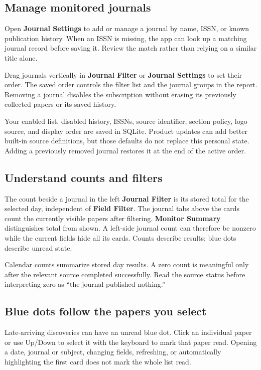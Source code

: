 \documentclass[10pt,letterpaper,oneside]{scrreprt}
\begin{document}
\subsection{Manage monitored journals}\label{manage-monitored-journals}

Open \textbf{Journal Settings} to add or manage a journal by name, ISSN, or known publication history. When an ISSN is missing, the app can look up a matching journal record before saving it. Review the match rather than relying on a similar title alone.

Drag journals vertically in \textbf{Journal Filter} or \textbf{Journal Settings} to set their order. The saved order controls the filter list and the journal groups in the report. Removing a journal disables the subscription without erasing its previously collected papers or its saved history.

Your enabled list, disabled history, ISSNs, source identifier, section policy, logo source, and display order are saved in SQLite. Product updates can add better built-in source definitions, but those defaults do not replace this personal state. Adding a previously removed journal restores it at the end of the active order.

\subsection{Understand counts and filters}\label{understand-counts-and-filters}

The count beside a journal in the left \textbf{Journal Filter} is its stored total for the selected day, independent of \textbf{Field Filter}. The journal tabs above the cards count the currently visible papers after filtering. \textbf{Monitor Summary} distinguishes total from shown. A left-side journal count can therefore be nonzero while the current fields hide all its cards. Counts describe results; blue dots describe unread state.

Calendar counts summarize stored day results. A zero count is meaningful only after the relevant source completed successfully. Read the source status before interpreting zero as ``the journal published nothing.''

\subsection{Blue dots follow the papers you select}\label{monitor-unread}

Late-arriving discoveries can have an unread blue dot. Click an individual paper or use Up/Down to select it with the keyboard to mark that paper read. Opening a date, journal or subject, changing fields, refreshing, or automatically highlighting the first card does not mark the whole list read.
\end{document}
